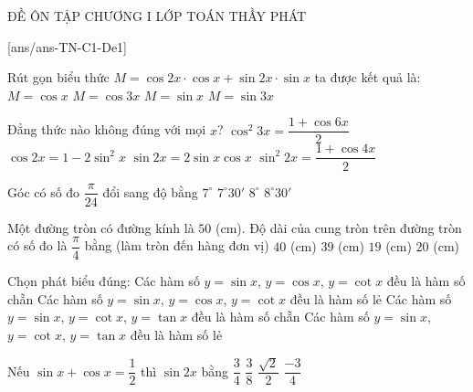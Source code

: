 \begin{name}
	{\tenchude}
	{ĐỀ ÔN TẬP CHƯƠNG I}
	{LỚP TOÁN THẦY PHÁT}
	{\thoigian}
\end{name}
\TN
\setcounter{ex}{0}
[ans/ans-TN-C1-De1]
\TN
\begin{ex}
	Rút gọn biểu thức $M=\cos 2x \cdot \cos x+\sin 2x \cdot \sin x$ ta được kết quả là:
	\choice
	{\True $M=\cos x$}
	{$M=\cos 3x$}
	{$M=\sin x$}
	{$M=\sin 3x$}
\end{ex}
\begin{ex}
	Đẳng thức nào không đúng với mọi $x$?
	\choice
	{$\cos^2 3x=\dfrac{1+\cos 6x}{2}$}
	{$\cos 2x=1-2\sin^2x$}
	{$\sin 2x=2\sin x\cos x$}
	{\True $\sin^2 2x=\dfrac{1+\cos 4x}{2}$}
\end{ex}
\begin{ex}
	Góc có số đo $\dfrac{\pi }{24}$ đổi sang độ bằng
	\choice
	{$7^\circ $}
	{\True $7^\circ 3{0}'$}
	{$8^\circ $}
	{$8^\circ 3{0}'$}
\end{ex}
\begin{ex}
	Một đường tròn có đường kính là $50$ (cm). Độ dài của cung tròn trên đường tròn có số đo là $\dfrac{\pi }{4}$ bằng (làm tròn đến hàng đơn vị)
	\choice
	{$40$ (cm)}
	{$39$ (cm)}
	{$19$ (cm)}
	{\True $20$ (cm)}
\end{ex}
\begin{ex}
	Chọn phát biểu đúng:
	\choice
	{Các hàm số $y=\sin x$, $y=\cos x$, $y=\cot x$ đều là hàm số chẵn}
	{Các hàm số $y=\sin x$, $y=\cos x$, $y=\cot x$ đều là hàm số lẻ}
	{Các hàm số $y=\sin x$, $y=\cot x$, $y=\tan x$ đều là hàm số chẵn}
	{\True Các hàm số $y=\sin x$, $y=\cot x$, $y=\tan x$ đều là hàm số lẻ}
\end{ex}
\begin{ex}
	Nếu $\sin x+\cos x=\dfrac{1}{2}$ thì $\sin 2x$ bằng
	\choice
	{$\dfrac{3}{4}$}
	{$\dfrac{3}{8}$}
	{$\dfrac{\sqrt{2}}{2}$}
	{\True $\dfrac{-3}{4}$}
\end{ex}

